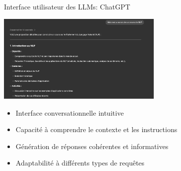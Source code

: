 \documentclass[aspectratio=169]{beamer}
\begin{document}
\begin{frame}{Interface utilisateur des LLMs: ChatGPT}
    \begin{center}
        \includegraphics[width=0.6\textwidth]{images/chatbot.png} 
    \end{center}
    \begin{itemize}
        \item Interface conversationnelle intuitive
        \item Capacité à comprendre le contexte et les instructions
        \item Génération de réponses cohérentes et informatives
        \item Adaptabilité à différents types de requêtes
    \end{itemize}
\end{frame}
\end{document}
